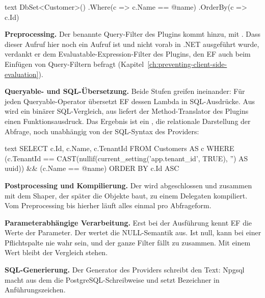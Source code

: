 \begin{sourcecode}{text}
DbSet<Customer>()
    .Where(c => c.Name == @name)
    .OrderBy(c => c.Id)
\end{sourcecode}

\textbf{Preprocessing.} Der benannte Query-Filter des Plugins kommt hinzu, mit
.
Dass dieser Aufruf hier noch ein Aufruf ist und nicht vorab in .NET ausgeführt wurde,
verdankt er dem Evaluatable-Expression-Filter des Plugins, den EF auch beim Einfügen von
Query-Filtern befragt (Kapitel~\ref{ch:preventing-client-side-evaluation}).

\textbf{Queryable- und SQL-Übersetzung.} Beide Stufen greifen ineinander: Für jeden
Queryable-Operator übersetzt EF dessen Lambda in SQL-Ausdrücke. Aus
 wird ein binärer SQL-Vergleich, aus
 liefert der Method-Translator des Plugins
einen Funktionsausdruck. Das Ergebnis ist ein , die
relationale Darstellung der Abfrage, noch unabhängig von der SQL-Syntax des Providers:

\begin{sourcecode}{text}
SELECT c.Id, c.Name, c.TenantId
FROM Customers AS c
WHERE (c.TenantId == CAST(nullif(current_setting('app.tenant_id', TRUE), '') AS uuid))
    && (c.Name == @name)
ORDER BY c.Id ASC
\end{sourcecode}

\textbf{Postprocessing und Kompilierung.} Der  wird
abgeschlossen und zusammen mit dem Shaper, der später die Objekte baut, zu einem Delegaten
kompiliert. Vom Preprocessing bis hierher läuft alles einmal pro Abfrageform.

\textbf{Parameterabhängige Verarbeitung.} Erst bei der Ausführung kennt EF die Werte der
Parameter. Der 
wertet die NULL-Semantik aus. Ist  null, kann  bei einer Pflichtspalte nie wahr sein, und der ganze Filter fällt zu 
zusammen. Mit einem Wert bleibt der Vergleich stehen.

\textbf{SQL-Generierung.} Der Generator des Providers schreibt den Text: Npgsql macht aus
dem  die PostgreSQL-Schreibweise  und setzt
Bezeichner in Anführungszeichen.

